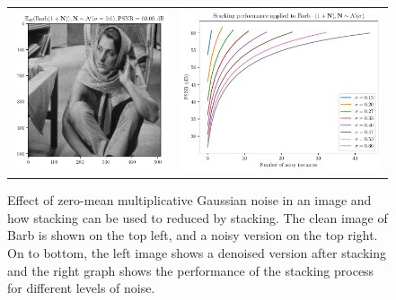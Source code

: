\documentclass{article}
\begin{document}
\begin{enumerate}
\begin{figure}
{\begin{tabular}{cc}
        \includegraphics{denoised_0MMGN_barb} & \includegraphics{PSNR_0MMGN_barb}
      \end{tabular}
    }
    \caption{Effect of zero-mean multiplicative Gaussian noise in an
      image and how stacking can be used to reduced by stacking. The
      clean image of Barb is shown on the top left, and a noisy
      version on the top right. On to bottom, the left image shows a
      denoised version after stacking and the right graph shows the
      performance of the stacking process for different levels of
      noise.\label{fig:0MMGN}}
  \end{figure}
  

\end{enumerate}
\end{document}
